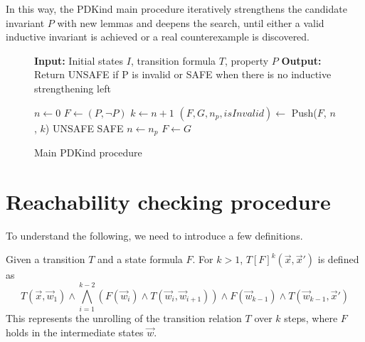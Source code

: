 In this way, the PDKind main procedure iteratively strengthens the candidate
invariant $P$ with new lemmas and deepens the search, until either a valid
inductive invariant is achieved or a real counterexample is discovered.

\begin{figure}[H]
\begin{mdframed}
\begin{algorithmic}[1]
\State \textbf{Input:} Initial states $I$, transition formula $T$, property $P$
\State \textbf{Output:} Return UNSAFE if P is invalid or SAFE when there is no inductive strengthening left

\State $n \gets 0$
    \State $F \gets (P, \neg P)$
        \State $k \gets n + 1$
        \State $(F, G, n_p, isInvalid) \gets$ Push($F$, $n$, $k$)
        \State \Return UNSAFE
        \EndIf
        \State \Return SAFE
        \EndIf
        \State $n \gets n_p$
        \State $F \gets G$
    \EndWhile

\end{algorithmic}
\end{mdframed}
\caption{Main PDKind procedure}\label{alg:4}
\end{figure}


\section{Reachability checking procedure}\label{ReachabilityChecking}

\noindent To understand the following, we need to introduce a few definitions.

\vspace{\baselineskip}\begin{definition}Given a transition $T$ and a state formula $F$.
For \( k > 1 \), \( T[F]^k(\vec{x}, \vec{x}') \) is defined as
                          \begin{equation*}
                              T(\vec{x}, \vec{w}_1) \land \bigwedge_{i=1}^{k-2} \left( F(\vec{w}_i) \land T(\vec{w}_i, \vec{w}_{i+1}) \right) \land F(\vec{w}_{k-1}) \land T(\vec{w}_{k-1}, \vec{x}')
                          \end{equation*}
                          This represents the unrolling of the transition relation $T$ over $k$ steps, where $F$ holds in the intermediate states $\vec{w}$.
                          \label{Transition}
\end{definition}

